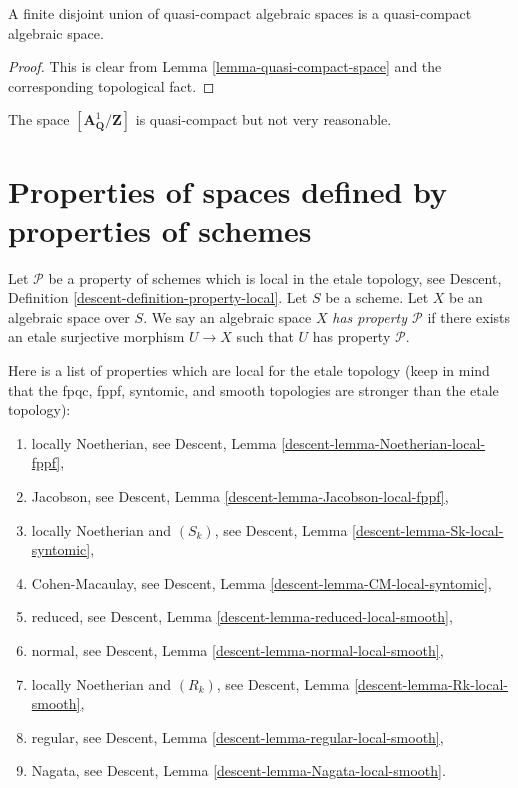 \begin{lemma}
\label{lemma-finite-disjoint-quasi-compact}
A finite disjoint union of quasi-compact algebraic spaces is
a quasi-compact algebraic space.
\end{lemma}

\begin{proof}
This is clear from
Lemma \ref{lemma-quasi-compact-space}
and the corresponding topological fact.
\end{proof}

\begin{example}
\label{example-quasi-compact-not-very-reasonable}
The space $[\mathbf{A}^1_{\mathbf{Q}}/\mathbf{Z}]$ is
quasi-compact but not very reasonable.
\end{example}






\section{Properties of spaces defined by properties of schemes}
\label{section-types-properties}

\begin{definition}
\label{definition-type-property}
Let $\mathcal{P}$ be a property of schemes which is 
local in the etale topology, see
Descent, Definition \ref{descent-definition-property-local}.
Let $S$ be a scheme.
Let $X$ be an algebraic space over $S$.
We say an algebraic space $X$ {\it has property $\mathcal{P}$}
if there exists an etale surjective morphism $U \to X$ such
that $U$ has property $\mathcal{P}$.
\end{definition}

\begin{remark}
\label{remark-list-properties-local-etale-topology}
Here is a list of properties which are local for the etale topology
(keep in mind that the fpqc, fppf, syntomic, and smooth topologies are
stronger than the etale topology):
\begin{enumerate}
\item locally Noetherian, see
Descent, Lemma \ref{descent-lemma-Noetherian-local-fppf},
\item Jacobson, see
Descent, Lemma \ref{descent-lemma-Jacobson-local-fppf},
\item locally Noetherian and $(S_k)$, see
Descent, Lemma \ref{descent-lemma-Sk-local-syntomic},
\item Cohen-Macaulay, see
Descent, Lemma \ref{descent-lemma-CM-local-syntomic},
\item reduced, see
Descent, Lemma \ref{descent-lemma-reduced-local-smooth},
\item normal, see
Descent, Lemma \ref{descent-lemma-normal-local-smooth},
\item locally Noetherian and $(R_k)$, see
Descent, Lemma \ref{descent-lemma-Rk-local-smooth},
\item regular, see
Descent, Lemma \ref{descent-lemma-regular-local-smooth},
\item Nagata, see
Descent, Lemma \ref{descent-lemma-Nagata-local-smooth}.
\end{enumerate}
\end{remark}

